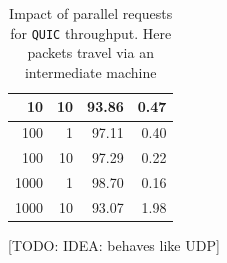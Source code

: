 \documentclass[12pt,a4paper,twoside,openright]{report}
\begin{document}
\begin{table}[H]
\begin{tabular}{|r|r|r|r|}
10                                                                                         & 10                                                                                                                   & 93.86                                                                                                                                  & 0.47                                                                                                \\ \hline
100                                                                                        & 1                                                                                                                    & 97.11                                                                                                                                  & 0.40                                                                                                \\ \hline
100                                                                                        & 10                                                                                                                   & 97.29                                                                                                                                  & 0.22                                                                                                \\ \hline
1000                                                                                       & 1                                                                                                                    & 98.70                                                                                                                                  & 0.16                                                                                                \\ \hline
1000                                                                                       & 10                                                                                                                   & 93.07                                                                                                                                  & 1.98                                                                                                \\ \hline
\end{tabular}

    \centering
    \caption{Impact of parallel requests for \texttt{QUIC} throughput. Here packets travel via an intermediate machine}
    \label{fig:QUIC_throughput_via_B_using_parallel_requests}
    
    
    [TODO: IDEA: behaves like UDP]
\end{table}
\end{document}
